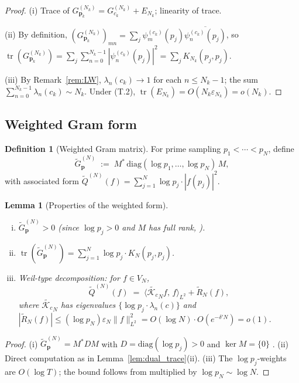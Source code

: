 \documentclass[12pt,a4paper]{amsart}
\newtheorem{lemma}[theorem]{Lemma}
\theoremstyle{definition}
\newtheorem{definition}[theorem]{Definition}
\newcommand{\Kop}{\mathcal{K}_c}
\newcommand{\GVMk}{G^{(N_k)}_{\mathbf{p}_k}}
\newcommand{\norm}[1]{\|#1\|}
\newcommand{\ip}[2]{\langle #1,\, #2\rangle}
\begin{document}
\begin{proof}
(i) Trace of $\GVMk=G_{c_k}^{(N_k)}+E_{N_k}$; linearity of trace.

(ii) By definition,
$(\GVMk)_{mn}=\sum_j\psi_m^{(c_k)}(p_j)\overline{\psi_n^{(c_k)}(p_j)}$,
so
$\operatorname{tr}(\GVMk)=\sum_j\sum_{n=0}^{N_k-1}|\psi_n^{(c_k)}(p_j)|^2
=\sum_j K_{N_k}(p_j,p_j)$.

(iii) By Remark~\ref{rem:LW},
$\lambda_n(c_k)\to1$ for each $n\leq N_k-1$;
the sum $\sum_{n=0}^{N_k-1}\lambda_n(c_k)\sim N_k$.
Under (T.2), $\operatorname{tr}(E_{N_k})=O(N_k\varepsilon_{N_k})=o(N_k)$.
\end{proof}

\subsection{Weighted Gram form}

\begin{definition}[Weighted Gram matrix]\label{def:weighted}
For prime sampling $p_1<\cdots<p_N$, define
\[
  \widetilde{G}^{(N)}_{\mathbf{p}}
  \;:=\;M^*\,\mathrm{diag}(\log p_1,\ldots,\log p_N)\,M,
\]
with associated form
$\widetilde{Q}^{(N)}(f)=\sum_{j=1}^N\log p_j\cdot|f(p_j)|^2$.
\end{definition}

\begin{lemma}[Properties of the weighted form]\label{lem:weighted}
\begin{enumerate}[(i)]
\item $\widetilde{G}^{(N)}_{\mathbf{p}}>0$
(since $\log p_j>0$ and $M$ has full rank,
\cite[Lemma~B]{PaperI}).
\item $\operatorname{tr}(\widetilde{G}^{(N)}_{\mathbf{p}})
=\sum_{j=1}^N\log p_j\cdot K_N(p_j,p_j)$.
\item Weil-type decomposition: for $f\in V_N$,
\[
  \widetilde{Q}^{(N)}(f)
  \;=\;\ip{\widetilde{\Kop}_N f}{f}_{L^2}+\widetilde{R}_N(f),
\]
where $\widetilde{\Kop}_N$ has eigenvalues
$\{\log p_j\cdot\lambda_n(c)\}$ and
$|\widetilde{R}_N(f)|\leq(\log p_N)\varepsilon_N\norm{f}_{L^2}^2
=O(\log N)\cdot O(e^{-\delta'N})=o(1)$.
\end{enumerate}
\end{lemma}

\begin{proof}
(i) $\widetilde{G}^{(N)}_{\mathbf{p}}=M^*DM$ with $D=\mathrm{diag}(\log p_j)>0$
and $\ker M=\{0\}$ \cite[Lemma~B]{PaperI}.
(ii) Direct computation as in Lemma~\ref{lem:dual_trace}(ii).
(iii) The $\log p_j$-weights are $O(\log T)$; the bound follows
from \cite[Thm.~1\,(IV)]{PaperI} multiplied by $\log p_N\sim\log N$.
\end{proof}
\end{document}

